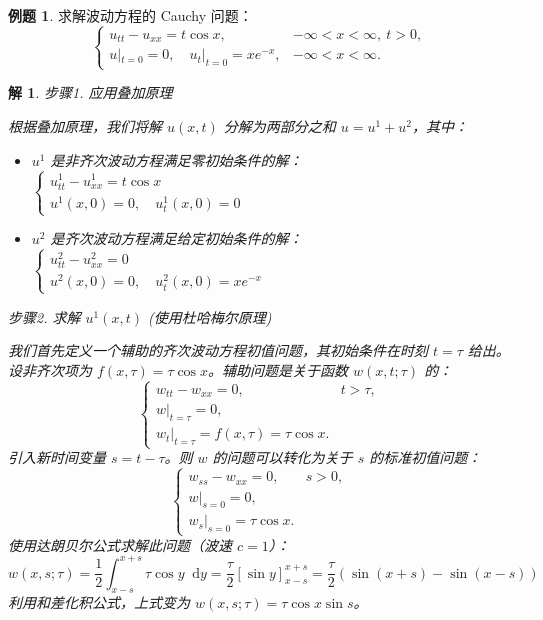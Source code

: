 \documentclass[12pt,a4paper]{article}
\newcommand{\diff}{\mathop{}\!\mathrm{d}}
\numberwithin{subsection}{section}   %
\numberwithin{subsubsection}{subsection}
\theoremstyle{plain}
\newtheorem{solution}{解}[subsection]  %
\theoremstyle{definition}
\newtheorem{example}{例题}[subsection]  %
\theoremstyle{remark}
\theoremstyle{remark}
\begin{document}
	\begin{example}
		求解波动方程的 Cauchy 问题：
		\[
		\begin{cases}
			u_{tt} - u_{xx} = t \cos x, & -\infty < x < \infty, \ t > 0, \\
			u|_{t=0} = 0, \quad u_t|_{t=0} = xe^{-x}, & -\infty < x < \infty.
		\end{cases}
		\]
		\begin{solution}
		步骤1. 应用叠加原理
		
		\noindent
		根据叠加原理，我们将解 $u(x,t)$ 分解为两部分之和 $u = u^1 + u^2$，其中：
		\begin{itemize}
			\item $u^1$ 是非齐次波动方程满足零初始条件的解：
			$
			\begin{cases}
				u^1_{tt} - u^1_{xx} = t\cos x \\
				u^1(x,0)=0, \quad u^1_{t}(x,0)=0
			\end{cases}
			$
			\item $u^2$ 是齐次波动方程满足给定初始条件的解：
			$
			\begin{cases}
				u^2_{tt} - u^2_{xx} = 0 \\
				u^2(x,0)=0, \quad u^2_{t}(x,0)=xe^{-x}
			\end{cases}
			$
		\end{itemize}
		
		
	步骤2. 求解 $u^1(x,t)$ (使用杜哈梅尔原理)
		
		\noindent
		我们首先定义一个辅助的齐次波动方程初值问题，其初始条件在时刻 $t=\tau$ 给出。设非齐次项为 $f(x,\tau) = \tau \cos x$。辅助问题是关于函数 $w(x, t; \tau)$ 的：
		\[
		\begin{cases}
			w_{tt} - w_{xx} = 0, & t > \tau, \\
			w|_{t=\tau} = 0, \\
			w_t|_{t=\tau} = f(x,\tau) = \tau \cos x.
		\end{cases}
		\]
		引入新时间变量 $s = t-\tau$。则 $w$ 的问题可以转化为关于 $s$ 的标准初值问题：
		\[
		\begin{cases}
			w_{ss} - w_{xx} = 0, & s > 0, \\
			w|_{s=0} = 0, \\
			w_s|_{s=0} = \tau \cos x.
		\end{cases}
		\]
		使用达朗贝尔公式求解此问题（波速 $c=1$）：
		\[
		w(x,s;\tau) = \frac{1}{2} \int_{x-s}^{x+s} \tau \cos y \diff y = \frac{\tau}{2}[\sin y]_{x-s}^{x+s} = \frac{\tau}{2}(\sin(x+s) - \sin(x-s))
		\]
		利用和差化积公式，上式变为 $w(x,s;\tau) = \tau \cos x \sin s$。
		

\end{solution}
\end{example}
\end{document}
